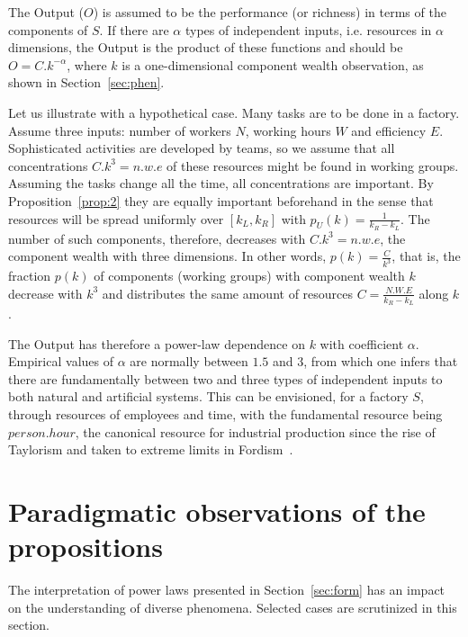 \documentclass[a4paper, 11pt]{article} %
\begin{document}
The Output ($O$)
is assumed to be the performance (or richness) in terms of the components of $S$.
If there are $\alpha$ types of independent inputs, i.e. resources in $\alpha$ dimensions,
the Output is the product of these functions and should be
$O =C.k^{-\alpha}$, where $k$ is a one-dimensional component wealth observation,
as shown in Section~\ref{sec:phen}. 

Let us illustrate with a hypothetical case.
Many tasks are to be done in a factory.
Assume three inputs:
number of workers $N$, working hours $W$
and efficiency $E$.
Sophisticated activities are developed by teams,
so we assume that all concentrations $C.k^3=n.w.e$
of these resources might be found in working groups.
Assuming the tasks change all the time,
all concentrations are important.
By Proposition~\ref{prop:2} they are equally important beforehand
in the sense that 
resources will be spread uniformly over $[k_L,k_R]$
with $p_U(k)=\frac{1}{k_R-k_L}$.
The number of such components, therefore,
decreases with $C.k^3=n.w.e$, the component wealth with three dimensions.
In other words,
$p(k)=\frac{C}{k^3}$, that is,
the fraction $p(k)$ of components (working groups) with component wealth $k$
decrease with $k^3$ and distributes the same
amount of resources $C=\frac{N.W.E}{k_R-k_L}$ along $k$.

The Output has therefore a power-law dependence on $k$ with coefficient $\alpha$. Empirical values of $\alpha$
are normally between $1.5$ and $3$, from which one infers that there are fundamentally between two and three types of independent inputs to both natural and artificial systems. This can be envisioned, for a factory $S$, through resources of employees and time, with the fundamental resource being $person . hour$, the canonical resource for industrial production since the rise of Taylorism and taken to extreme limits in Fordism~\cite{fordism}.

\section{Paradigmatic observations of the propositions}\label{sec:par}
The interpretation of power laws presented in Section~\ref{sec:form} has an impact on the
understanding of
diverse phenomena. Selected cases are scrutinized in this section.
 
\end{document}
